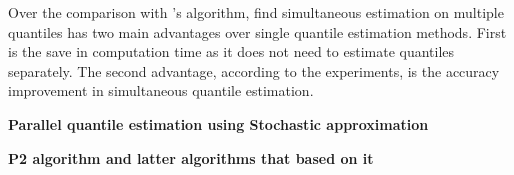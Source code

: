     Over the comparison with \citeauthor{liechtySinglepassLowstorageArbitrary}'s algorithm, \citeauthor{mcdermottDataSkeletonsSimultaneous2007}\cite{mcdermottDataSkeletonsSimultaneous2007} find simultaneous estimation on multiple quantiles has two main advantages over single quantile estimation methods. First is the save in computation time as it does not need to estimate quantiles separately. The second advantage, according to the experiments, is the accuracy improvement in simultaneous quantile estimation.  


    
\textbf{
    Parallel quantile estimation using Stochastic approximation \cite{hammerSmoothEstimatesMultiple2019}
}

\textbf{P2 algorithm and latter algorithms that based on it}


\fi